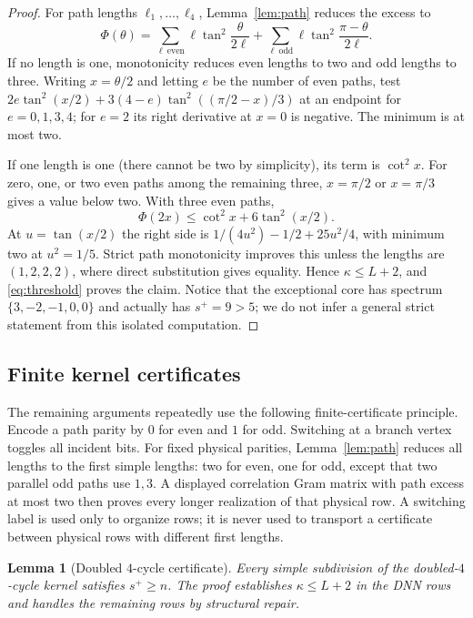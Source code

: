 \documentclass[11pt]{article}
\newtheorem{lemma}[theorem]{Lemma}
\theoremstyle{remark}
\newcommand{\splus}{s^+}
\begin{document}
\begin{proof}
For path lengths $\ell_1,\ldots,\ell_4$, Lemma~\ref{lem:path} reduces the
excess to
\[
 \Phi(\theta)=\sum_{\ell\ \mathrm{even}}\ell\tan^2\frac{\theta}{2\ell}
 +\sum_{\ell\ \mathrm{odd}}\ell\tan^2\frac{\pi-\theta}{2\ell}.
\]
If no length is one, monotonicity reduces even lengths to two and odd lengths
to three.  Writing $x=\theta/2$ and letting $e$ be the number of even paths,
test
$2e\tan^2(x/2)+3(4-e)\tan^2((\pi/2-x)/3)$ at an endpoint for
$e=0,1,3,4$; for $e=2$ its right derivative at $x=0$ is negative.  The
minimum is at most two.

If one length is one (there cannot be two by simplicity), its term is
$\cot^2x$.  For zero, one, or two even paths among the remaining three,
$x=\pi/2$ or $x=\pi/3$ gives a value below two.  With three even paths,
\[
 \Phi(2x)\leq\cot^2x+6\tan^2(x/2).
\]
At $u=\tan(x/2)$ the right side is
$1/(4u^2)-1/2+25u^2/4$, with minimum two at $u^2=1/5$.
Strict path monotonicity improves this unless the lengths are $(1,2,2,2)$,
where direct substitution gives equality.  Hence $\kappa\leq L+2$, and
\eqref{eq:threshold} proves the claim.  Notice that the exceptional core has
spectrum $\{3,-2,-1,0,0\}$ and actually has $\splus=9>5$; we do not infer a
general strict statement from this isolated computation.
\end{proof}

\subsection{Finite kernel certificates}

The remaining arguments repeatedly use the following finite-certificate
principle.  Encode a path parity by $0$ for even and $1$ for odd.  Switching at
a branch vertex toggles all incident bits.  For fixed physical parities,
Lemma~\ref{lem:path} reduces all lengths to the first simple lengths: two for
even, one for odd, except that two parallel odd paths use $1,3$.  A displayed
correlation Gram matrix with path excess at most two then proves every longer
realization of that physical row.  A switching label is used only to organize
rows; it is never used to transport a certificate between physical rows with
different first lengths.

\begin{lemma}[Doubled $4$-cycle certificate]\label{lem:dc4}
Every simple subdivision of the doubled-$4$-cycle kernel satisfies
$\splus\geq n$.  The proof establishes $\kappa\leq L+2$ in the DNN rows and
handles the remaining rows by structural repair.
\end{lemma}
\end{document}
